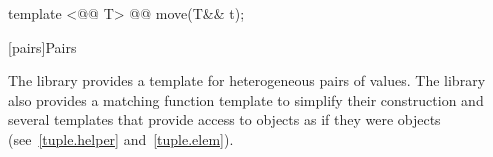 \documentclass[american,twoside]{book}
\begin{document}
\begin{itemdescr}
\pnum
{}
\end{itemdescr}

\setcounter{Paras}{6}
%
\begin{itemdecl}
template <@@ T> @@ move(T&& t);
\end{itemdecl}

\begin{itemdescr}
\pnum
{}
\end{itemdescr}

[pairs]{Pairs}

\pnum
The library provides a template for heterogeneous pairs of values.
The library also provides a matching function template to simplify
their construction and several templates that provide access to 
objects as if they were  objects (see~\ref{tuple.helper}
and~\ref{tuple.elem}).%
%
%
%
\end{document}
